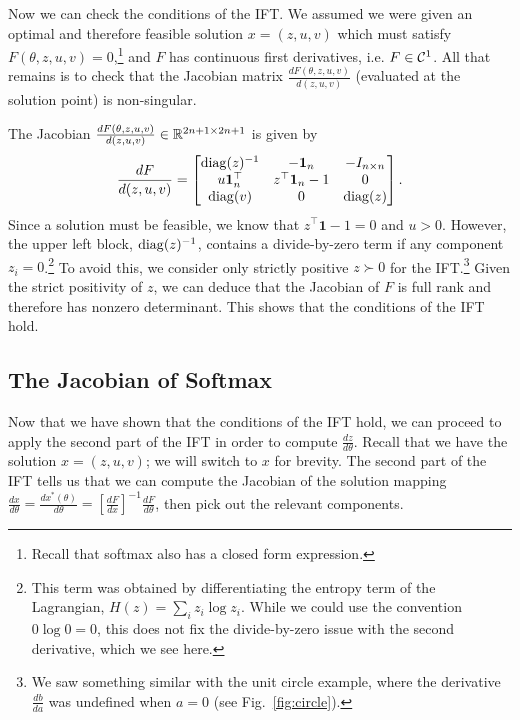 \documentclass[11pt]{article}
\begin{document}
Now we can check the conditions of the IFT.
We assumed we were given an optimal and therefore feasible solution $x=(z,u,v)$
which must satisfy $F(\theta, z,u,v) = 0$,\footnote{
Recall that softmax also has a closed form expression.}
and $F$ has continuous first derivatives, i.e. $F \in \mathcal{C}^1$.
All that remains is to check that the Jacobian matrix $\frac{dF(\theta,z,u,v)}{d(z,u,v)}$
(evaluated at the solution point) is non-singular.

The Jacobian $\frac{dF(\theta,z,u,v)}{d(z,u,v)}\in\mathbb{R}^{2n+1\times 2n+1}$ is given by
\begin{equation}
\label{eqn:f-jac}
\frac{dF}{d(z,u,v)}=
\begin{bmatrix}
\mathrm{diag}(z)^{-1} & -\mathbf{1}_n & -I_{n\times n} \\
u\mathbf{1}_n^\top & z^\top\mathbf{1}_n - 1 & 0\\
\mathrm{diag}(v) & 0 & \mathrm{diag}(z)
\end{bmatrix}.
\end{equation}
Since a solution must be feasible, we know that $z^\top\mathbf{1}-1=0$ and $u > 0$.
However, the upper left block, $\mathrm{diag}(z)^{-1}$, contains a divide-by-zero term if
any component $z_i = 0$.\footnote{
This term was obtained by differentiating the entropy
term of the Lagrangian, $H(z) = \sum_i z_i\log z_i$.
While we could use the convention $0\log 0 = 0$,
this does not fix the divide-by-zero issue with the second derivative, which we see here.
}
To avoid this, we consider only strictly positive $z \succ 0$ for the IFT.\footnote{
We saw something similar with the unit circle example, where the derivative
$\frac{db}{da}$ was undefined when $a=0$ (see Fig.~\ref{fig:circle}).
}
Given the strict positivity of $z$,
we can deduce that the Jacobian of $F$ is full rank and therefore has nonzero determinant.
This shows that the conditions of the IFT hold.

\subsection{The Jacobian of Softmax}
Now that we have shown that the conditions of the IFT hold,
we can proceed to apply the second part of the IFT in order to compute $\frac{dz}{d\theta}$.
Recall that we have the solution $x = (z,u,v)$; we will switch to $x$ for brevity.
The second part of the IFT tells us that we can compute the Jacobian of the
solution mapping $\frac{dx}{d\theta} = \frac{dx^*(\theta)}{d\theta}
= \left[\frac{dF}{dx}\right]^{-1}\frac{dF}{d\theta}$,
then pick out the relevant components.
\end{document}

